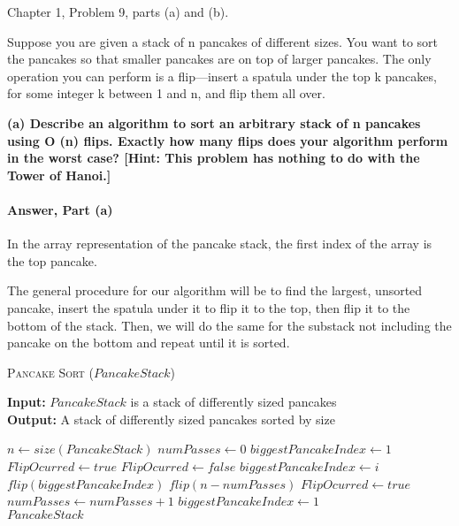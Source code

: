 \documentclass{article}
\begin{document}
\collab{\todo{}}

Chapter 1, Problem 9, parts (a) and (b).

Suppose you are given a stack of n pancakes of different sizes. You want to
sort the pancakes so that smaller pancakes are on top of larger pancakes.
The only operation you can perform is a flip—insert a spatula under the
top k pancakes, for some integer k between 1 and n, and flip them all over.

{\bf (a) Describe an algorithm to sort an arbitrary stack of n pancakes using
O (n) flips. Exactly how many flips does your algorithm perform in the
worst case? [Hint: This problem has nothing to do with the Tower of
Hanoi.]}

\paragraph{Answer, Part (a)}

In the array representation of the pancake stack, the first index of the array
is the top pancake.

The general procedure for our algorithm will be to find the largest, unsorted pancake,
insert the spatula under it to flip it to the top, then flip it to the bottom of the stack.
Then, we will do the same for the substack not including the pancake on the bottom and repeat until it is sorted.

\begin{algorithm} \caption{\textsc{Pancake Sort} ($PancakeStack$)}\label{alg:seb}
    {\bf Input:} $PancakeStack$ is a stack of differently sized pancakes\\
    {\bf Output:} A stack of differently sized pancakes sorted by size
    \begin{algorithmic}[1]
        \State$n \gets size(PancakeStack)$
        \State$numPasses \gets 0$
        \State$biggestPancakeIndex \gets 1$
        \State$FlipOcurred \gets true$
        \State$FlipOcurred \gets false$
        \State$biggestPancakeIndex \gets i$
        \EndIf{}
        \EndFor{}
        \State$flip(biggestPancakeIndex)$
        \State$flip(n - numPasses)$
        \State$FlipOcurred \gets true$
        \EndIf{}
        \State$ numPasses \gets numPasses + 1$
        \State$biggestPancakeIndex \gets 1$
        \EndWhile{}\\
        \Return$PancakeStack$
    \end{algorithmic}
\end{algorithm}
\end{document}
